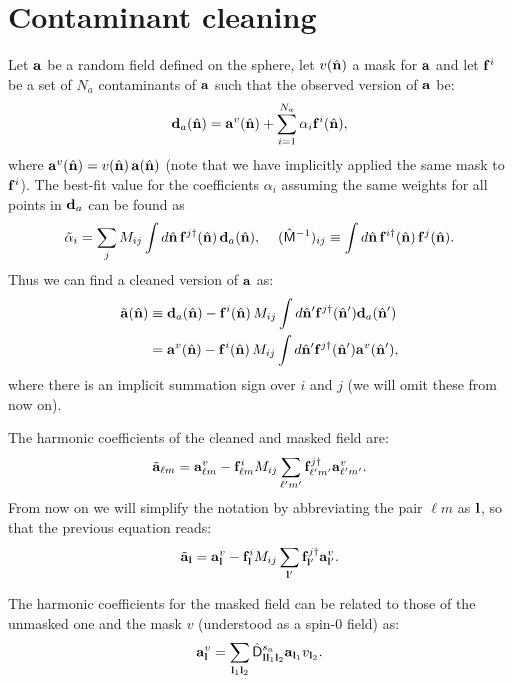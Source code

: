 \documentclass[a4paper,10pt]{article}
\newcommand{\nv}{\hat{\bf n}}
\begin{document}
\section{Contaminant cleaning}\label{sec:contaminant}
  Let ${\bf a}$ be a random field defined on the sphere, let $v(\nv)$ a mask for ${\bf a}$ and let ${\bf f}^i$ be a set of $N_a$ contaminants of ${\bf a}$ such that the observed version of ${\bf a}$ be:
  \begin{equation}
    {\bf d}_a(\nv)={\bf a}^v(\nv)+\sum_{i=1}^{N_a}\alpha_i{\bf f}^i(\nv),
  \end{equation}
  where ${\bf a}^v(\nv)=v(\nv)\,{\bf a}(\nv)$ (note that we have implicitly applied the same mask to ${\bf f}^i$). The best-fit value for the coefficients $\alpha_i$ assuming the same weights for all points in ${\bf d}_a$ can be found as
  \begin{equation}
    \tilde{\alpha}_i=\sum_jM_{ij}\int d\nv\,{\bf f}^{j\dag}(\nv)\,{\bf d}_a(\nv),\hspace{12pt}
    (\hat{\sf M}^{-1})_{ij}\equiv\int d\nv\,{\bf f}^{i\dag}(\nv)\,{\bf f}^j(\nv).
  \end{equation}
  Thus we can find a cleaned version of ${\bf a}$ as:
  \begin{align}
    \tilde{\bf a}(\nv)&\equiv{\bf d}_a(\nv)-{\bf f}^i(\nv)\,M_{ij}\int d\nv'{\bf f}^{j\dag}(\nv'){\bf d}_a(\nv')\\
                      &={\bf a}^v(\nv)-{\bf f}^i(\nv)\,M_{ij}\int d\nv'{\bf f}^{j\dag}(\nv'){\bf a}^v(\nv'),
  \end{align}
  where there is an implicit summation sign over $i$ and $j$ (we will omit these from now on).
  
  The harmonic coefficients of the cleaned and masked field are:
  \begin{equation}
   \tilde{\bf a}_{\ell m}={\bf a}^v_{\ell m}-{\bf f}^i_{\ell m}M_{ij}\sum_{\ell' m'}{\bf f}^{j\dag}_{\ell' m'}{\bf a}^{v}_{\ell' m'}.
  \end{equation}
  From now on we will simplify the notation by abbreviating the pair $\ell m$ as ${\bf l}$, so that the previous equation reads:
  \begin{equation}
   \tilde{\bf a}_{\bf l}={\bf a}^v_{\bf l}-{\bf f}^i_{\bf l}M_{ij}\sum_{{\bf l}'}{\bf f}^{j\dag}_{{\bf l}'}{\bf a}^{v}_{{\bf l}'}.
  \end{equation}

  The harmonic coefficients for the masked field can be related to those of the unmasked one and the mask $v$ (understood as a spin-0 field) as:
  \begin{equation}
    {\bf a}^v_{\bf l}=\sum_{{\bf l}_1{\bf l}_2}\hat{\sf D}^{s_a}_{{\bf l}{\bf l}_1{\bf l}_2}{\bf a}_{{\bf l}_1}v_{{\bf l}_2}.
  \end{equation}
\end{document}
